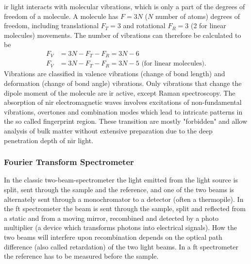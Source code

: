 \Gls{ir} light interacts with molecular vibrations, which is only a part of the degrees of freedom of a molecule.
A molecule has $F=3N$ ($N$ number of atoms) degrees of freedom, including translational $F_T=3$ and rotational $F_R=3$ (2 for linear molecules) movements. 
%
The number of vibrations can therefore be calculated to be
\begin{align*}
	F_V &= 3N - F_T - F_R = 3N - 6 \\
	F_V &= 3N - F_T - F_R = 3N - 5 \textrm{ (for linear molecules)}.
\end{align*}
Vibrations are classified in valence vibrations (change of bond length) and deformation (change of bond angle) vibrations\cite{Melker2006}. 
Only vibrations that change the dipole moment of the molecule are \gls{ir} active, except Raman spectroscopy. 
The absorption of \Gls{nir} electromagnetic waves involves excitations of non-fundamental vibrations, overtones and combination modes which lead to intricate patterns in the so called fingerprint region. 
These transition are mostly "forbidden" and allow analysis of bulk matter without extensive preparation
due to the deep penetration depth of \gls{nir} light\cite{bec2019breakthrough}.


\subsubsection{Fourier Transform Spectrometer}
In the classic two-beam-spectrometer the light emitted from the light source is split, 
sent through the sample and the reference, and one of the two beams is alternately 
sent through a monochromator to a detector (often a thermopile).
%
In the \gls{ft} spectrometer the beam is sent through the sample, split and 
reflected from a static and from a moving mirror, recombined and detected by a photo 
multiplier (a device which transforms photons into electrical signals). 
How the two beams will interfere upon recombination depends on the optical path difference (also called retardation) of the two light beams\cite{Schwedt2008}.
In a \gls{ft} spectrometer the reference has to be measured before the sample.
%


